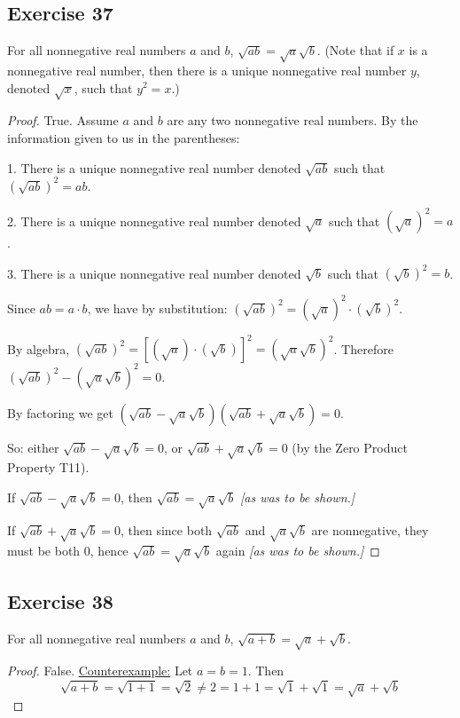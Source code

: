\documentclass[14pt]{extarticle}
\begin{document}
\subsection{Exercise 37}
For all nonnegative real numbers $a$ and $b$, $\sqrt{ab} = \sqrt{a}\sqrt{b}$. (Note that if $x$ is a nonnegative real number, then there is a unique nonnegative real number $y$, denoted $\sqrt{x}$, such that $y^2 = x$.)

\begin{proof}
    True. Assume $a$ and $b$ are any two nonnegative real numbers. By the information given to us in the parentheses:

    1. There is a unique nonnegative real number denoted $\sqrt{ab}$ such that $(\sqrt{ab})^2 = ab$.

    2. There is a unique nonnegative real number denoted $\sqrt{a}$ such that $(\sqrt{a})^2 = a$.

    3. There is a unique nonnegative real number denoted $\sqrt{b}$ such that $(\sqrt{b})^2 = b$.

    Since $ab = a \cdot b$, we have by substitution: $(\sqrt{ab})^2 = (\sqrt{a})^2 \cdot (\sqrt{b})^2$.

    By algebra, $(\sqrt{ab})^2 = [(\sqrt{a}) \cdot (\sqrt{b})]^2 = (\sqrt{a}\sqrt{b})^2$. Therefore $(\sqrt{ab})^2 - (\sqrt{a}\sqrt{b})^2 = 0$.

    By factoring we get $(\sqrt{ab} - \sqrt{a}\sqrt{b})(\sqrt{ab} + \sqrt{a}\sqrt{b}) = 0$.

    So: either $\sqrt{ab} - \sqrt{a}\sqrt{b} = 0$, or $\sqrt{ab} + \sqrt{a}\sqrt{b} = 0$ (by the Zero Product Property T11).

    If $\sqrt{ab} - \sqrt{a}\sqrt{b} = 0$, then $\sqrt{ab} = \sqrt{a}\sqrt{b}$ {\it [as was to be shown.]}

    If $\sqrt{ab} + \sqrt{a}\sqrt{b} = 0$, then since both $\sqrt{ab}$ and $\sqrt{a}\sqrt{b}$ are nonnegative, they must be both 0, hence $\sqrt{ab} = \sqrt{a}\sqrt{b}$ again {\it [as was to be shown.]}
\end{proof}

\subsection{Exercise 38}
For all nonnegative real numbers $a$ and $b$, $\sqrt{a + b} = \sqrt{a} + \sqrt{b}$.

\begin{proof}
    False. \underline{Counterexample:} Let $a = b = 1$. Then
    \[
        \sqrt{a+b} = \sqrt{1+1} = \sqrt{2} \neq 2 = 1 + 1 = \sqrt{1} + \sqrt{1} = \sqrt{a} + \sqrt{b}
    \]
\end{proof}
\end{document}
